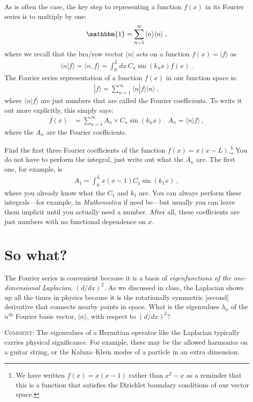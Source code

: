 \documentclass[12pt]{article}
\numberwithin{equation}{section}    %
\begin{document}
As is often the case, the key step to representing a function $f(x)$ in its Fourier series is to multiply by one:
\begin{align}
	\mathbbm{1} = \sum_{n=1}^\infty |n\rangle \langle n| \ ,
\end{align}
where we recall that the bra/row vector $\langle n|$ acts on a function $f(x)=|f\rangle$ as
\begin{align}
	\langle n | f\rangle = \langle n, f\rangle = \int_0^L dx\, C_n \sin(k_n x) f(x) \ .
\end{align}
The Fourier series representation of a function $f(x)$ in our function space is:
\begin{align}
	|f\rangle = \sum_{n=1}^\infty \langle n|f\rangle  |n\rangle  \ ,
\end{align}
where $\langle n|f\rangle$ are just numbers that are called the Fourier coefficients. To write it out more explicitly, this simply says:
\begin{align}
	f(x) &= \sum_{n=1}^\infty A_n \times C_n \sin(k_n x) & A_n = \langle n|f\rangle \ ,
	\end{align}
	where the $A_n$ are the Fourier coefficients.

Find the first three Fourier coefficients of the function $f(x) = x(x-L)$.\footnote{We have written $f(x) = x(x-1)$ rather than $x^2-x$ as a reminder that this is a function that satisfies the Dirichlet boundary conditions of our vector space.} You do not have to perform the integral, just write out what the $A_n$ are. The first one, for example, is
\begin{align}
	A_1 = \int_0^L x(x-1) C_1 \sin(k_1 x) \ ,
\end{align}
where you already know what the $C_1$ and $k_1$ are. You can always perform these integrals---for example, in \emph{Mathematica} if need be---but usually you can leave them implicit until you actually need a number. After all, these coefficients are just numbers with no functional dependence on $x$.


\section{So what?}

The Fourier series is convenient because it is a basis of \emph{eigenfunctions of the one-dimensional Laplacian}, $(d/dx)^2$. As we discussed in class, the Laplacian shows up all the times in physics because it is the rotationally symmetric [second] derivative that connects nearby points in space. What is the eigenvalues $\lambda_n$ of the $n^\text{th}$ Fourier basis vector, $|n\rangle$, with respect to $(d/dx)^2$?

\textsc{Comment:} The eigenvalues of a Hermitian operator like the Laplacian typically carries physical significance. For example, these may be the allowed harmonics on a guitar string, or the Kaluza--Klein modes of a particle in an extra dimension. 
\end{document}
